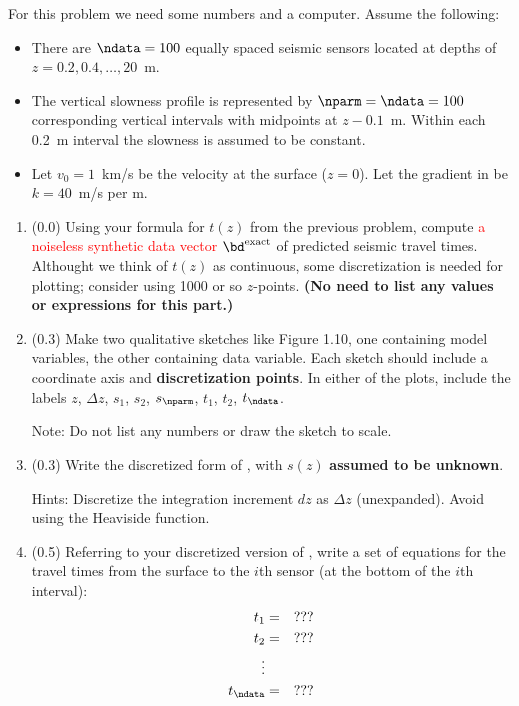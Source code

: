 \documentclass[11pt,titlepage,fleqn]{article}
\begin{document}
For this problem we need some numbers and a computer. Assume the following:
%
\begin{itemize}
\item There are $\ndata=100$ equally spaced seismic sensors located at depths of $z = 0.2, 0.4, \ldots, 20$~m.
\item The vertical slowness profile is represented by $\nparm=\ndata=100$ corresponding vertical intervals with midpoints at $z - 0.1$~m. Within each 0.2~m interval the slowness is assumed to be constant.
\item Let $v_0 = 1$~km/s be the velocity at the surface ($z=0$). Let the gradient in  be $k = 40$~m/s per m.
\end{itemize}

\begin{enumerate}

\item (0.0) Using your formula for $t(z)$ from the previous problem, compute \textcolor{red}{a noiseless synthetic data vector $\bd^{\rm exact}$} of predicted seismic travel times. Althought we think of $t(z)$ as continuous, some discretization is needed for plotting; consider using 1000 or so $z$-points. 
{\bf (No need to list any values or expressions for this part.)}

\item (0.3)  Make two qualitative sketches like Figure 1.10, one containing model variables, the other containing data variable. Each sketch should include a coordinate axis and {\bf discretization points}. In either of the plots, include the labels $z$, $\Delta z$, $s_1$, $s_2$, $s_\nparm$, $t_1$, $t_2$, $t_\ndata$.

Note: Do not list any numbers or draw the sketch to scale.


\item (0.3) Write the discretized form of , with $s(z)$ {\bf assumed to be unknown}.

Hints: Discretize the integration increment $dz$ as $\Delta z$ (unexpanded). Avoid using the Heaviside function.


\item (0.5) Referring to your discretized version of , write a set of equations for the travel times from the surface to the $i$th sensor (at the bottom of the $i$th interval):
%
\begin{eqnarray*}
t_1 &=& ???
\\
t_2 &=& ???
\\
\vdots
\\
t_\ndata &=& ???
\end{eqnarray*}


\end{enumerate}
\end{document}
